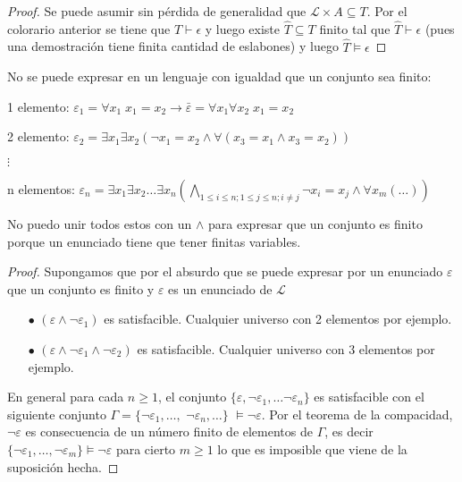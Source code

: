 \begin{proof}
Se puede asumir sin p\'erdida de generalidad que $\mathcal{L} \times A \subseteq T$. Por el colorario anterior se tiene que $T \vdash \epsilon$ y luego existe $\hat{T} \subseteq T$ finito tal que $\hat{T}\vdash \epsilon$ (pues una demostraci\'on tiene finita cantidad de eslabones) y luego $\hat{T} \models \epsilon$
\end{proof}

\begin{aplicacion}
No se puede expresar en un lenguaje con igualdad que un conjunto sea finito:

1 elemento: $\varepsilon_1 = \forall x_1 \; x_1 = x_2 \rightarrow \bar{\varepsilon} = \forall x_1 \forall x_2 \; x_1 = x_2$

2 elemento: $\varepsilon_2 = \exists x_1 \exists x_2 (\neg x_1 = x_2 \land \forall (x_3 = x_1 \land x_3 = x_2))$

$\vdots$

n elementos: $\varepsilon_n = \exists x_1 \exists x_2 \ldots \exists x_n (\bigwedge_{1 \leq i \leq n ; 1 \leq j \leq n; i \neq j} \neg x_i = x_j \land \forall x_m (\ldots))$

\end{aplicacion}

\begin{observation}
No puedo unir todos estos con un $\land$ para expresar que un conjunto es finito porque un enunciado tiene que tener finitas variables.
\end{observation}

\begin{proof}
Supongamos que por el absurdo que se puede expresar por un enunciado $\varepsilon$ que un conjunto es finito y $\varepsilon$ es un enunciado de $\mathcal{L}$

\begin{enumerate}
	\item[$\bullet$] $(\varepsilon \land \neg \varepsilon_1)$ es satisfacible. Cualquier universo con 2 elementos por ejemplo.
	\item[$\bullet$] $(\varepsilon \land \neg \varepsilon_1 \land \neg \varepsilon_2)$	es satisfacible. Cualquier universo con 3 elementos por ejemplo.
\end{enumerate}

En general para cada $n \geq 1$, el conjunto $\{ \varepsilon, \neg \varepsilon_1, \ldots \neg \varepsilon_n\}$ es satisfacible con el siguiente conjunto $\Gamma = \{ \neg \varepsilon_1, \ldots, $ $\neg \varepsilon_n, \ldots \}$ $\models \neg \varepsilon$. Por el teorema de la compacidad, $\neg \varepsilon$ es consecuencia de un n\'umero finito de elementos de $\Gamma$, es decir $\{ \neg \varepsilon_1, \ldots, \neg	\varepsilon_m \} \models \neg \varepsilon$  para cierto $m \geq 1$ lo que es imposible que viene de la suposici\'on hecha.

\end{proof}

